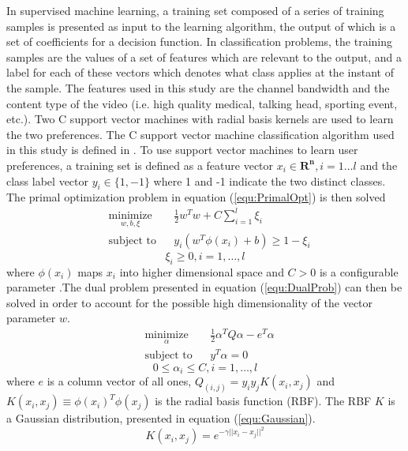 In supervised machine learning, a training set composed of a series of training samples is presented as input to the learning algorithm, the output of which is a set of coefficients for a decision function. In classification problems, the training samples are the values of a set of features which are relevant to the output, and a label for each of these vectors which denotes what class applies at the instant of the sample. The features used in this study are the channel bandwidth and the content type of the video (i.e. high quality medical, talking head, sporting event, etc.). Two C support vector machines with radial basis kernels are used to learn the two preferences. The C support vector machine classification algorithm used in this study is defined in \cite{LibSVM}. To use support vector machines to learn user preferences, a training set is defined as a feature vector $x_i \in \mathbf{R^n}  ,i=1\ldots{l}$ and the class label vector $y_i \in \lbrace 1,-1 \rbrace $ where 1 and -1 indicate the two distinct classes. The primal optimization problem in equation (\ref{equ:PrimalOpt}) is then solved \cite{LibSVM}
\begin{equation}
\begin{aligned}
\label{equ:PrimalOpt}
& \underset{w,b,\xi}{\text{minimize}}
& & \frac{1}{2}w^Tw+C\sum_{i=1}^{l} \xi_i \\
& \text{subject to}
& &  y_i(w^T\phi(x_i) + b) \ge 1 - \xi_i
\end{aligned}
\end{equation}
\[ \xi_i \ge 0, i = 1,\ldots ,l \]
where $\phi (x_i)$ maps $x_i$ into higher dimensional space and $C > 0$ is a configurable parameter \cite{LibSVM}.The dual problem presented in equation (\ref{equ:DualProb}) can then be solved in order to account for the possible high dimensionality of the vector parameter $w$.
\begin{equation}
\begin{aligned}
\label{equ:DualProb}
& \underset{\alpha}{\text{minimize}}
& & \frac{1}{2}\alpha^TQ\alpha-e^T\alpha \\
& \text{subject to}
& &  y^T\alpha = 0
\end{aligned}
\end{equation}
\[ 0 \le \alpha_i \le C, i = 1,\ldots ,l \]
where $e$ is a column vector of all ones, $Q_(i,j)=y_i y_j K(x_i,x_j)$ and $K(x_i,x_j ) \equiv \phi (x_i )^T \phi (x_j)$ is the radial basis function (RBF). The RBF $K$ is a Gaussian distribution, presented in equation (\ref{equ:Gaussian}).
\begin{equation}
\label{equ:Gaussian}
K(x_i, x_j) = e^{-\gamma ||x_i - x_j||^{2}}
\end{equation}

